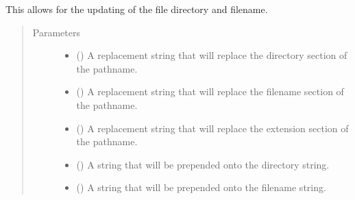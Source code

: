\documentclass[letterpaper,10pt,english]{sphinxmanual}
\begin{document}
\begin{fulllineitems}
\begin{fulllineitems}
\label{\detokenize{python_docstrings/IfA_Smeargle.zulu.zulu_main:IfA_Smeargle.zulu.zulu_main.IfasDataArray.update_pathname}}
This allows for the updating of the file directory and filename.
\begin{quote}\begin{description}
\item[{Parameters}] \leavevmode\begin{itemize}
\item {} 
 (\sphinxstyleliteralemphasis{\sphinxupquote{ (}}\sphinxstyleliteralemphasis{\sphinxupquote{)}}) \textendash{} A replacement string that will replace the directory section
of the pathname.

\item {} 
 (\sphinxstyleliteralemphasis{\sphinxupquote{ (}}\sphinxstyleliteralemphasis{\sphinxupquote{)}}) \textendash{} A replacement string that will replace the filename section
of the pathname.

\item {} 
 (\sphinxstyleliteralemphasis{\sphinxupquote{ (}}\sphinxstyleliteralemphasis{\sphinxupquote{)}}) \textendash{} A replacement string that will replace the extension section
of the pathname.

\item {} 
 (\sphinxstyleliteralemphasis{\sphinxupquote{ (}}\sphinxstyleliteralemphasis{\sphinxupquote{)}}) \textendash{} A string that will be prepended onto the directory string.

\item {} 
 (\sphinxstyleliteralemphasis{\sphinxupquote{ (}}\sphinxstyleliteralemphasis{\sphinxupquote{)}}) \textendash{} A string that will be prepended onto the filename string.


\end{itemize}
\end{description}
\end{quote}
\end{fulllineitems}
\end{fulllineitems}
\end{document}
